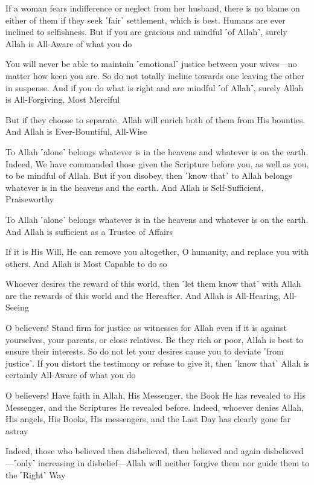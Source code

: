 If a woman fears indifference or neglect from her husband, there is no blame on either of them if they seek ˹fair˺ settlement, which is best. Humans are ever inclined to selfishness. But if you are gracious and mindful ˹of Allah˺, surely Allah is All-Aware of what you do

You will never be able to maintain ˹emotional˺ justice between your wives—no matter how keen you are. So do not totally incline towards one leaving the other in suspense. And if you do what is right and are mindful ˹of Allah˺, surely Allah is All-Forgiving, Most Merciful

But if they choose to separate, Allah will enrich both of them from His bounties. And Allah is Ever-Bountiful, All-Wise

To Allah ˹alone˺ belongs whatever is in the heavens and whatever is on the earth. Indeed, We have commanded those given the Scripture before you, as well as you, to be mindful of Allah. But if you disobey, then ˹know that˺ to Allah belongs whatever is in the heavens and the earth. And Allah is Self-Sufficient, Praiseworthy

To Allah ˹alone˺ belongs whatever is in the heavens and whatever is on the earth. And Allah is sufficient as a Trustee of Affairs

If it is His Will, He can remove you altogether, O humanity, and replace you with others. And Allah is Most Capable to do so

Whoever desires the reward of this world, then ˹let them know that˺ with Allah are the rewards of this world and the Hereafter. And Allah is All-Hearing, All-Seeing

O believers! Stand firm for justice as witnesses for Allah even if it is against yourselves, your parents, or close relatives. Be they rich or poor, Allah is best to ensure their interests. So do not let your desires cause you to deviate ˹from justice˺. If you distort the testimony or refuse to give it, then ˹know that˺ Allah is certainly All-Aware of what you do

O believers! Have faith in Allah, His Messenger, the Book He has revealed to His Messenger, and the Scriptures He revealed before. Indeed, whoever denies Allah, His angels, His Books, His messengers, and the Last Day has clearly gone far astray

Indeed, those who believed then disbelieved, then believed and again disbelieved—˹only˺ increasing in disbelief—Allah will neither forgive them nor guide them to the ˹Right˺ Way

